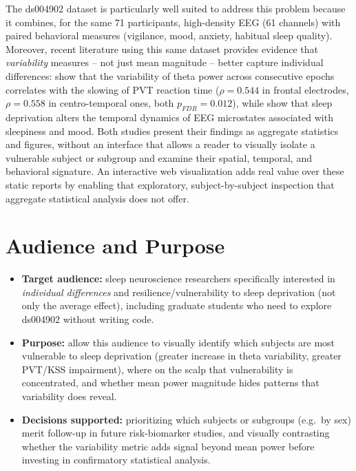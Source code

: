 \documentclass[10pt]{article}
\begin{document}
The ds004902 dataset is particularly well suited to address this problem because it combines, for the same 71 participants, high-density EEG (61 channels) with paired behavioral measures (vigilance, mood, anxiety, habitual sleep quality). Moreover, recent literature using this same dataset provides evidence that \emph{variability} measures -- not just mean magnitude -- better capture individual differences: \citet{cui2026} show that the variability of theta power across consecutive epochs correlates with the slowing of PVT reaction time ($\rho=0.544$ in frontal electrodes, $\rho=0.558$ in centro-temporal ones, both $p_{FDR}=0.012$), while \citet{bai2025} show that sleep deprivation alters the temporal dynamics of EEG microstates associated with sleepiness and mood. Both studies present their findings as aggregate statistics and figures, without an interface that allows a reader to visually isolate a vulnerable subject or subgroup and examine their spatial, temporal, and behavioral signature. An interactive web visualization adds real value over these static reports by enabling that exploratory, subject-by-subject inspection that aggregate statistical analysis does not offer.

\section{Audience and Purpose}
\begin{itemize}
    \item \textbf{Target audience:} sleep neuroscience researchers specifically interested in \emph{individual differences} and resilience/vulnerability to sleep deprivation (not only the average effect), including graduate students who need to explore ds004902 without writing code.
    \item \textbf{Purpose:} allow this audience to visually identify which subjects are most vulnerable to sleep deprivation (greater increase in theta variability, greater PVT/KSS impairment), where on the scalp that vulnerability is concentrated, and whether mean power magnitude hides patterns that variability does reveal.
    \item \textbf{Decisions supported:} prioritizing which subjects or subgroups (e.g.\ by sex) merit follow-up in future risk-biomarker studies, and visually contrasting whether the variability metric adds signal beyond mean power before investing in confirmatory statistical analysis.
\end{itemize}
\end{document}
